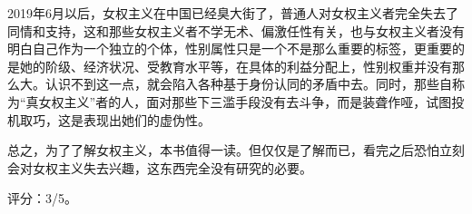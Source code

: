 2019年6月以后，女权主义在中国已经臭大街了，普通人对女权主义者完全失去了同情和支持，这和那些女权主义者不学无术、偏激任性有关，也与女权主义者没有明白自己作为一个独立的个体，性别属性只是一个不是那么重要的标签，更重要的是她的阶级、经济状况、受教育水平等，在具体的利益分配上，性别权重并没有那么大。认识不到这一点，就会陷入各种基于身份认同的矛盾中去。同时，那些自称为“真女权主义”者的人，面对那些下三滥手段没有去斗争，而是装聋作哑，试图投机取巧，这是表现出她们的虚伪性。

总之，为了了解女权主义，本书值得一读。但仅仅是了解而已，看完之后恐怕立刻会对女权主义失去兴趣，这东西完全没有研究的必要。

评分：3/5。